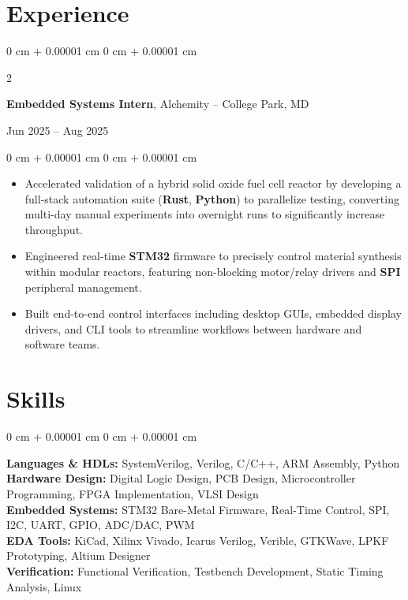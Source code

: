 \documentclass[10pt, letterpaper]{article}
\newenvironment{highlights}{
    \begin{itemize}[
        topsep=0.05 cm,
        parsep=0.05 cm,
        partopsep=0pt,
        itemsep=0pt,
        leftmargin=0 cm + 10pt
    ]
}{
    \end{itemize}
}
\newenvironment{onecolentry}{
    \begin{adjustwidth}{
        0 cm + 0.00001 cm
    }{
        0 cm + 0.00001 cm
    }
}{
    \end{adjustwidth}
}
\newenvironment{twocolentry}[2][]{
    \onecolentry
    \def\secondColumn{#2}
    \setcolumnwidth{\fill, 4.5 cm}
    \begin{paracol}{2}
}{
    \switchcolumn \raggedleft \secondColumn
    \end{paracol}
    \endonecolentry
}
\begin{document}
    \section{Experience}

        \begin{twocolentry}{
            Jun 2025 – Aug 2025
        }
            \textbf{Embedded Systems Intern}, Alchemity -- College Park, MD
        \end{twocolentry}
        \vspace{0.05 cm}
        \begin{onecolentry}
            \begin{highlights}
                \item Accelerated validation of a hybrid solid oxide fuel cell reactor by developing a full-stack automation suite (\textbf{Rust}, \textbf{Python}) to parallelize testing, converting multi-day manual experiments into overnight runs to significantly increase throughput.
                \item Engineered real-time \textbf{STM32} firmware to precisely control material synthesis within modular reactors, featuring non-blocking motor/relay drivers and \textbf{SPI} peripheral management.
                \item Built end-to-end control interfaces including desktop GUIs, embedded display drivers, and CLI tools to streamline workflows between hardware and software teams.
            \end{highlights}
        \end{onecolentry}

        \vspace{0.10 cm}

    \section{Skills}
        \begin{onecolentry}
            \textbf{Languages \& HDLs:} SystemVerilog, Verilog, C/C++, ARM Assembly, Python \\
            \textbf{Hardware Design:} Digital Logic Design, PCB Design, Microcontroller Programming, FPGA Implementation, VLSI Design \\
            \textbf{Embedded Systems:} STM32 Bare-Metal Firmware, Real-Time Control, SPI, I2C, UART, GPIO, ADC/DAC, PWM \\
            \textbf{EDA Tools:} KiCad, Xilinx Vivado, Icarus Verilog, Verible, GTKWave, LPKF Prototyping, Altium Designer \\
            \textbf{Verification:} Functional Verification, Testbench Development, Static Timing Analysis, Linux
        \end{onecolentry}
\end{document}
